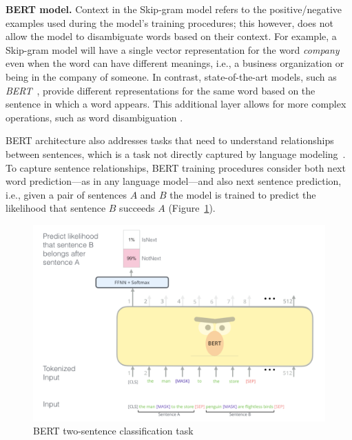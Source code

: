 \smallskip
\begin{hangparas}{.0in}{0}
    {\small \textbf{BERT model.}} Context in the Skip-gram model refers to the positive/negative examples used during the model's training procedures; this however, does not allow the model to disambiguate words based on their context. For example, a Skip-gram model will have a single vector representation for the word \textit{company} even when the word can have different meanings, i.e., a business organization or being in the company of someone. In contrast, state-of-the-art models, such as \textit{BERT}~\cite{Devlin2018Bert}, provide different representations for the same word based on the sentence in which a word appears.
    This additional layer allows for more complex operations, such as word disambiguation .
\end{hangparas}


BERT architecture also addresses tasks that need to understand relationships between sentences, which is a task not directly captured by language modeling~\cite{Devlin2018Bert}.
To capture sentence relationships, BERT training procedures consider both next word prediction---as in any language model---and also next sentence prediction, i.e., given a pair of sentences $A$ and $B$ the model 
is trained to predict the likelihood that sentence $B$ succeeds $A$ (Figure~\ref{fig:BERT}). 


\begin{figure}
    \centering
    \includegraphics[width=.75\linewidth]{fig/cp5/BERT}
    \caption{BERT two-sentence classification task }
    \label{fig:BERT}
\end{figure}



